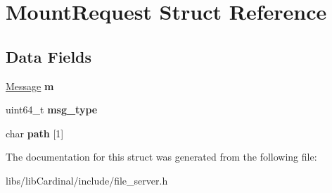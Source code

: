 \hypertarget{structMountRequest}{}\section{Mount\+Request Struct Reference}
\label{structMountRequest}
\subsection*{Data Fields}
\begin{DoxyCompactItemize}
\item 
\hyperlink{structMessage}{Message} {\bfseries m}\hypertarget{structMountRequest_a86076c7717a04f9a9e956c94cb5753fa}{}\label{structMountRequest_a86076c7717a04f9a9e956c94cb5753fa}

\item 
uint64\+\_\+t {\bfseries msg\+\_\+type}\hypertarget{structMountRequest_a45be25bee9a39efdbe073acc3d29ab65}{}\label{structMountRequest_a45be25bee9a39efdbe073acc3d29ab65}

\item 
char {\bfseries path} \mbox{[}1\mbox{]}\hypertarget{structMountRequest_aeb063a21449583db221e1fa426329c30}{}\label{structMountRequest_aeb063a21449583db221e1fa426329c30}

\end{DoxyCompactItemize}


The documentation for this struct was generated from the following file\+:\begin{DoxyCompactItemize}
\item 
libs/lib\+Cardinal/include/file\+\_\+server.\+h\end{DoxyCompactItemize}
